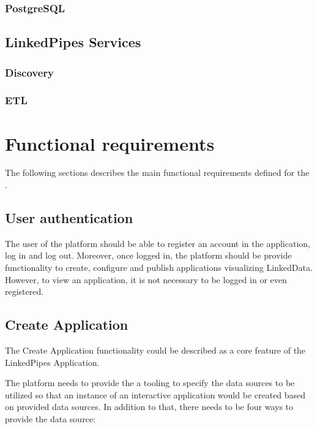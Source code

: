 \subsubsection{PostgreSQL} 

\subsection{LinkedPipes Services} 

\subsubsection{Discovery} 

\subsubsection{ETL} 

\subsection{\lpas{}}

\section{Functional requirements}

The following sections describes the main functional requirements defined for the \lpa{}. 

\subsection{User authentication}

The user of the platform should be able to register an account in the application, log in and log out. Moreover, once logged in, the platform should be provide functionality to create, configure and publish applications visualizing LinkedData. However, to view an application, it is not necessary to be logged in or even registered.

\subsection{Create Application}

The Create Application functionality could be described as a core feature of the LinkedPipes Application.

The platform needs to provide the a tooling to specify the data sources to be utilized so that an instance of an interactive application would be created based on provided data sources. In addition to that, there needs to be four ways to provide the data source:

